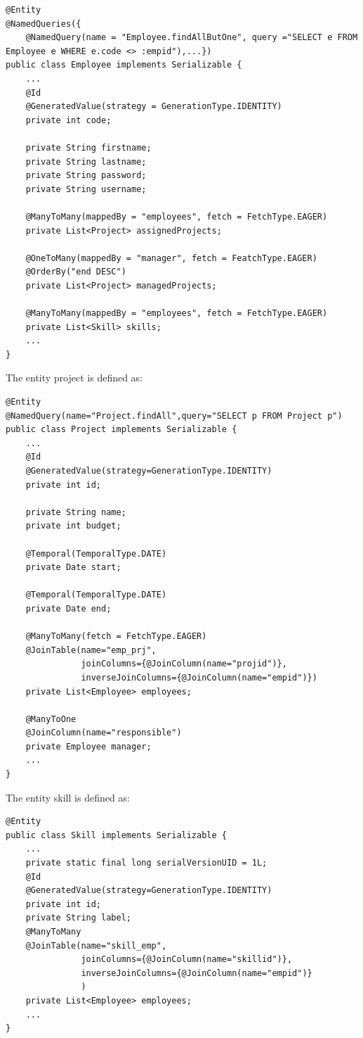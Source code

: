 \begin{lstlisting}[style=Java]
@Entity
@NamedQueries({
    @NamedQuery(name = "Employee.findAllButOne", query ="SELECT e FROM Employee e WHERE e.code <> :empid"),...})
public class Employee implements Serializable {
    ...
    @Id
    @GeneratedValue(strategy = GenerationType.IDENTITY)
    private int code;

    private String firstname;
    private String lastname;
    private String password;
    private String username;

    @ManyToMany(mappedBy = "employees", fetch = FetchType.EAGER)
    private List<Project> assignedProjects;

    @OneToMany(mappedBy = "manager", fetch = FeatchType.EAGER)
    @OrderBy("end DESC")
    private List<Project> managedProjects;

    @ManyToMany(mappedBy = "employees", fetch = FetchType.EAGER)
    private List<Skill> skills;
    ...
}
\end{lstlisting}
The entity project is defined as:  
\begin{lstlisting}[style=Java]
@Entity
@NamedQuery(name="Project.findAll",query="SELECT p FROM Project p")
public class Project implements Serializable {
    ...
    @Id
    @GeneratedValue(strategy=GenerationType.IDENTITY)
    private int id;

    private String name;
    private int budget;

    @Temporal(TemporalType.DATE)
    private Date start;

    @Temporal(TemporalType.DATE)
    private Date end;

    @ManyToMany(fetch = FetchType.EAGER)
    @JoinTable(name="emp_prj",
               joinColumns={@JoinColumn(name="projid")}, 
               inverseJoinColumns={@JoinColumn(name="empid")})
    private List<Employee> employees;

    @ManyToOne
    @JoinColumn(name="responsible")
    private Employee manager;
    ...
}
\end{lstlisting}
The entity skill is defined as:  
\begin{lstlisting}[style=Java]
@Entity
public class Skill implements Serializable {
    ...
    private static final long serialVersionUID = 1L;
    @Id
    @GeneratedValue(strategy=GenerationType.IDENTITY)
    private int id;
    private String label;
    @ManyToMany
    @JoinTable(name="skill_emp",
               joinColumns={@JoinColumn(name="skillid")},
               inverseJoinColumns={@JoinColumn(name="empid")}
               )
    private List<Employee> employees;
    ... 
}
\end{lstlisting}